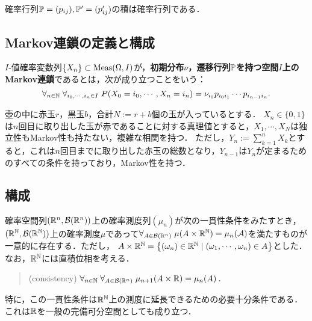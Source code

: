 \documentclass[uplatex,dvipdfmx]{jsreport}
\begin{document}
\begin{lemma}[確率行列は群をなす？]
    確率行列$\mathbb{P}=(p_{ij}),\mathbb{P}'=(p'_{ij})$の積は確率行列である．
\end{lemma}

\subsection{Markov連鎖の定義と構成}

\begin{definition}
    $I$-値確率変数列$\{X_n\}\subset\mathrm{Meas}(\Omega,I)$が，\textbf{初期分布$\nu$，遷移行列$\mathbb{P}$を持つ空間$I$上のMarkov連鎖}であるとは，次が成り立つことをいう：
    \[\forall_{n\in\mathbb{N}}\;\forall_{i_0,\cdots,i_n\in I}\;P(X_0=i_0,\cdots,X_n=i_n)=\nu_{i_0}p_{i_0i_1}\cdots p_{i_{n-1}i_n}.\]
\end{definition}

\begin{example}
    壺の中に赤玉$r$，黒玉$b$，合計$N:=r+b$個の玉が入っているとする．
    $X_n\in\{0,1\}$は$n$回目に取り出した玉が赤であることに対する真理値とすると，$X_1,\cdots,X_N$は独立性もMarkov性も持たない，複雑な相関を持つ．
    ただし，$Y_n:=\sum_{k=1}^nX_k$とすると，これは$n$回目までに取り出した赤玉の総数となり，$Y_{n-1}$は$Y_n$が定まるためのすべての条件を持っており，Markov性を持つ．
\end{example}

\subsection{構成}

\begin{theorem}[Kolmogorov]\label{thm-Kolmogorov-extension-theorem}
    確率空間列$(\mathbb{R}^n,\mathcal{B}(\mathbb{R}^n))$上の確率測度列$(\mu_n)$が次の一貫性条件をみたすとき，$(\mathbb{R}^{\mathbb{N}},\mathcal{B}(\mathbb{R}^{\mathbb{N}}))$上の確率測度$\mu$であって$\forall_{A\in\mathcal{B}(\mathbb{R}^n)}\;\mu(A\times\mathbb{R}^{\mathbb{N}})=\mu_n(\mathcal{A})$を満たすものが一意的に存在する．ただし，
    $A\times\mathbb{R}^{\mathbb{N}}=\left\{(\omega_n)\in\mathbb{R}^{\mathbb{N}}\mid (\omega_1,\cdots,\omega_n)\in A\right\}$とした．
    なお，$\mathbb{R}^{\mathbb{N}}$には直積位相を考える．
    \begin{quotation}
        (consistency) $\forall_{n\in\mathbb{N}}\;\forall_{A\in\mathcal{B}(\mathbb{R}^n)}\;\mu_{n+1}(A\times\mathbb{R})=\mu_n(A)$．
    \end{quotation}
    特に，この一貫性条件は$\mathbb{R}^{\mathbb{N}}$上の測度に延長できるための必要十分条件である．
    これは$\mathbb{R}$を一般の完備可分空間としても成り立つ．
\end{theorem}
\end{document}
